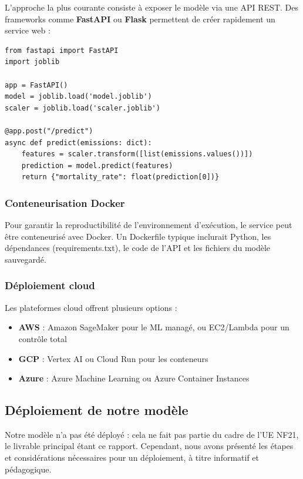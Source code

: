\documentclass[11pt,a4paper]{article}
\begin{document}
L'approche la plus courante consiste à exposer le modèle via une API REST. Des frameworks comme \textbf{FastAPI} ou \textbf{Flask} permettent de créer rapidement un service web :

\begin{lstlisting}[style=pythonstyle]
from fastapi import FastAPI
import joblib

app = FastAPI()
model = joblib.load('model.joblib')
scaler = joblib.load('scaler.joblib')

@app.post("/predict")
async def predict(emissions: dict):
    features = scaler.transform([list(emissions.values())])
    prediction = model.predict(features)
    return {"mortality_rate": float(prediction[0])}
\end{lstlisting}

\subsubsection{Conteneurisation Docker}

Pour garantir la reproductibilité de l'environnement d'exécution, le service peut être conteneurisé avec Docker. Un Dockerfile typique inclurait Python, les dépendances (requirements.txt), le code de l'API et les fichiers du modèle sauvegardé.

\subsubsection{Déploiement cloud}

Les plateformes cloud offrent plusieurs options :
\begin{itemize}[noitemsep]
    \item \textbf{AWS} : Amazon SageMaker pour le ML managé, ou EC2/Lambda pour un contrôle total
    \item \textbf{GCP} : Vertex AI ou Cloud Run pour les conteneurs
    \item \textbf{Azure} : Azure Machine Learning ou Azure Container Instances
\end{itemize}

\subsection{Déploiement de notre modèle}

Notre modèle n'a pas été déployé : cela ne fait pas partie du cadre de l'UE NF21, le livrable principal étant ce rapport. Cependant, nous avons présenté les étapes et considérations nécessaires pour un déploiement, à titre informatif et pédagogique.
\end{document}
